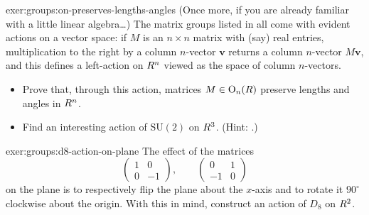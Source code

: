 \begin{exer}{}{exer:groups:on-preserves-lengths-angles}
  (Once more, if you are already familiar with a little linear
  algebra\dots) The matrix groups listed in
   all come with evident
  actions on a vector space: if $M$ is an $n \times n$ matrix with
  (say) real entries, multiplication to the right by a column
  $n$-vector $\mathbf{v}$ returns a column $n$-vector $M\mathbf{v}$,
  and this defines a left-action on $R^n$ viewed as the space of
  column $n$-vectors.
  \begin{itemize}
  \item Prove that, through this action, matrices
    $M \in \mathrm{O}_n(R)$ preserve lengths and angles in $R^n$.
  \item Find an interesting action of $\mathrm{SU}(2)$ on $R^3$.
    (Hint: .)
  \end{itemize}
\end{exer}
\begin{exer}{}{exer:groups:d8-action-on-plane}
  The effect of the matrices
  \[
    \begin{pmatrix} 1 & 0 \\ 0 & -1 \end{pmatrix}, \qquad
    \begin{pmatrix} 0 & 1 \\ -1 & 0 \end{pmatrix}
  \]
  on the plane is to respectively flip the plane about the $x$-axis
  and to rotate it $90^\circ$ clockwise about the origin. With this in
  mind, construct an action of $D_8$ on $R^2$.
\end{exer}
